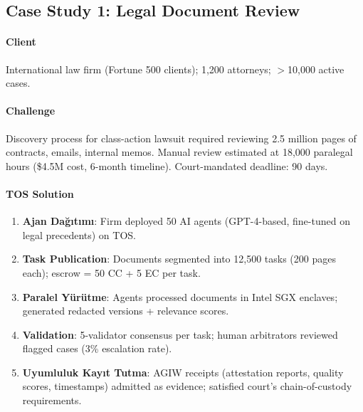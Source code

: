 \documentclass[11pt]{article}
\begin{document}
\begin{itemize}[noitemsep]
\begin{itemize}[noitemsep]
\begin{itemize}[noitemsep]
\begin{itemize}[noitemsep]
\begin{itemize}[noitemsep]
\begin{itemize}[noitemsep]
\begin{itemize}[noitemsep]
\begin{enumerate}[noitemsep]
\begin{itemize}[noitemsep]
\subsection{Case Study 1: Legal Document Review}

\paragraph{Client} International law firm (Fortune 500 clients); 1,200 attorneys; $>$10,000 active cases.

\paragraph{Challenge} Discovery process for class-action lawsuit required reviewing 2.5 million pages of contracts, emails, internal memos. Manual review estimated at 18,000 paralegal hours (\$4.5M cost, 6-month timeline). Court-mandated deadline: 90 days.

\paragraph{TOS Solution}
\begin{enumerate}[noitemsep]
  \item \textbf{Ajan Dağıtımı}: Firm deployed 50 AI agents (GPT-4-based, fine-tuned on legal precedents) on TOS.
  \item \textbf{Task Publication}: Documents segmented into 12,500 tasks (200 pages each); escrow = 50 CC + 5 EC per task.
  \item \textbf{Paralel Yürütme}: Agents processed documents in Intel SGX enclaves; generated redacted versions + relevance scores.
  \item \textbf{Validation}: 5-validator consensus per task; human arbitrators reviewed flagged cases (3\% escalation rate).
  \item \textbf{Uyumluluk Kayıt Tutma}: AGIW receipts (attestation reports, quality scores, timestamps) admitted as evidence; satisfied court's chain-of-custody requirements.
\end{enumerate}


\end{itemize}
\end{enumerate}
\end{itemize}
\end{itemize}
\end{itemize}
\end{itemize}
\end{itemize}
\end{itemize}
\end{itemize}
\end{document}
